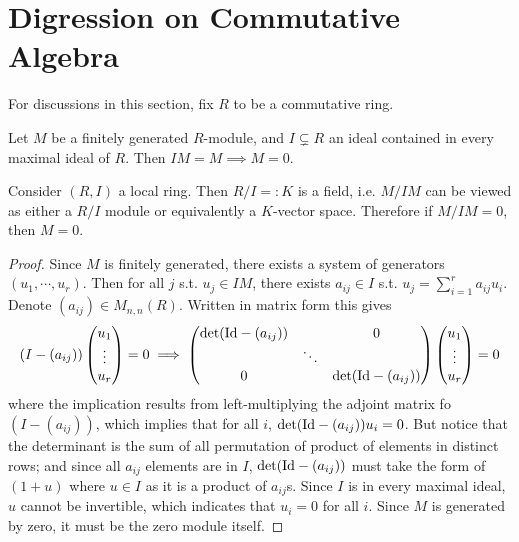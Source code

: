 \documentclass{article}
\begin{document}
\section{Digression on Commutative Algebra}

For discussions in this section, fix $R$ to be a commutative ring.

\begin{lemma}\label{lem:Nakayama}
    Let $M$ be a finitely generated $R$-module, and $I\subsetneq R$ an ideal contained in every maximal ideal of $R$. Then $IM = M\implies M = 0$.
\end{lemma}

\begin{remark}
    Consider $(R, I)$ a local ring. Then $R/I =: K$ is a field, i.e. $M/IM$ can be viewed as either a $R/I$ module or equivalently a $K$-vector space. Therefore if $M/IM = 0$, then $M = 0$.
\end{remark}

\begin{proof}
    Since $M$ is finitely generated, there exists a system of generators $(u_1, \cdots, u_r)$. Then for all $j$ s.t. $u_j\in IM$, there exists $a_{ij}\in I$ s.t. $u_j = \sum\limits_{i=1}^r a_{ij} u_i$. Denote $(a_{ij})\in M_{n, n}(R)$. Written in matrix form this gives 
    \[
        (I - (a_{ij}))\begin{pmatrix} u_1\\ \vdots \\ u_r \end{pmatrix} = 0 \implies \begin{pmatrix}
            \det(\mathrm{Id} - (a_{ij})) & & 0 \\
            & \ddots & \\
            0 & & \det(\mathrm{Id} - (a_{ij}))
        \end{pmatrix}\begin{pmatrix}
            u_1 \\ \vdots \\ u_r
        \end{pmatrix} = 0
    \]
    where the implication results from left-multiplying the adjoint matrix fo $ (I - (a_{ij}))$, which implies that for all $i$, $\det(\mathrm{Id} - (a_{ij})) u_i = 0$. But notice that the determinant is the sum of all permutation of product of elements in distinct rows; and since all $a_{ij}$ elements are in $I$, $\det(\mathrm{Id} - (a_{ij}))$ must take the form of $(1 + u)$ where $u\in I$ as it is a product of $a_{ij}$s. Since $I$ is in every maximal ideal, $u$ cannot be invertible, which indicates that $u_i = 0$ for all $i$. Since $M$ is generated by zero, it must be the zero module itself. 
\end{proof}
\end{document}

